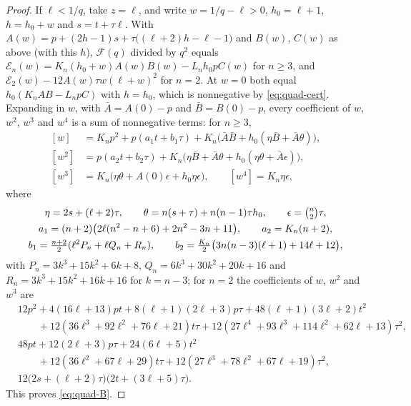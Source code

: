 \begin{proof}
If $\ell<1/q$, take $z=\ell$, and write $w=1/q-\ell>0$, $h_0=\ell+1$, $h=h_0+w$ and $s=t+\tau\ell$. With $A(w)=p+(2h-1)s+\tau\bigl((\ell+2)h-\ell-1\bigr)$ and $B(w)$, $C(w)$ as above (with this $h$), $\mathcal F(q)$ divided by $q^2$ equals $\mathcal E_n(w)=K_n(h_0+w)A(w)B(w)-L_nh_0pC(w)$ for $n\geq3$, and $\mathcal E_2(w)-12A(w)\tau w(\ell+w)^2$ for $n=2$. At $w=0$ both equal $h_0(K_nAB-L_npC)$ with $h=h_0$, which is nonnegative by \eqref{eq:quad-cert}. Expanding in $w$, with $\bar A=A(0)-p$ and $\bar B=B(0)-p$, every coefficient of $w$, $w^2$, $w^3$ and $w^4$ is a sum of nonnegative terms: for $n\geq3$,
\[
\begin{aligned}
[w]&=K_np^2+p(a_1t+b_1\tau)+K_n\bigl(\bar A\bar B+h_0(\eta\bar B+\bar A\theta)\bigr),\\
[w^2]&=p(a_2t+b_2\tau)+K_n\bigl(\eta\bar B+\bar A\theta+h_0(\eta\theta+\bar A\epsilon)\bigr),\\
[w^3]&=K_n\bigl(\eta\theta+A(0)\epsilon+h_0\eta\epsilon\bigr),\qquad[w^4]=K_n\eta\epsilon,
\end{aligned}
\]
where
\[
\begin{gathered}
\eta=2s+(\ell+2)\tau,\qquad\theta=n(s+\tau)+n(n-1)\tau h_0,\qquad\epsilon=\tbinom n2\tau,\\
a_1=(n+2)\bigl(2\ell(n^2-n+6)+2n^2-3n+11\bigr),\qquad a_2=K_n(n+2),\\
b_1=\tfrac{n+2}2(\ell^2P_n+\ell Q_n+R_n),\qquad b_2=\tfrac{K_n}2\bigl(3n(n-3)(\ell+1)+14\ell+12\bigr),
\end{gathered}
\]
with $P_n=3k^3+15k^2+6k+8$, $Q_n=6k^3+30k^2+20k+16$ and $R_n=3k^3+15k^2+16k+16$ for $k=n-3$; for $n=2$ the coefficients of $w$, $w^2$ and $w^3$ are
\[
\begin{aligned}
&12p^2+4(16\ell+13)pt+8(\ell+1)(2\ell+3)p\tau+48(\ell+1)(3\ell+2)t^2\\&\qquad+12(36\ell^3+92\ell^2+76\ell+21)t\tau+12(27\ell^4+93\ell^3+114\ell^2+62\ell+13)\tau^2,\\
&48pt+12(2\ell+3)p\tau+24(6\ell+5)t^2\\&\qquad+12(36\ell^2+67\ell+29)t\tau+12(27\ell^3+78\ell^2+67\ell+19)\tau^2,\\
&12\bigl(2s+(\ell+2)\tau\bigr)\bigl(2t+(3\ell+5)\tau\bigr).
\end{aligned}
\]
This proves \eqref{eq:quad-B}.


\end{proof}
